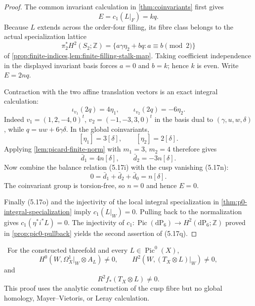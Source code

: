 \begin{proof}
The common invariant calculation in \cref{thm:coinvariants} first gives
\[
 E=c_1(L|_F)=kq.
\]
Because $L$ extends across the order-four filling, its fibre class belongs
to the actual specialization lattice
\[
 \pi_2^*H^2(S_2;\mathbb Z)
 =\{a\gamma\eta_2+bq:a\equiv b\pmod2\}
\]
of \cref{prop:finite-indices,lem:finite-filling-stalk-map}.  Taking
coefficient independence in the displayed invariant basis forces
$a=0$ and $b=k$; hence $k$ is even.  Write $E=2nq$.

Contraction with the two affine translation vectors is an exact integral
calculation:
\[
 \iota_{v_1}(2q)=4\eta_1,
 \qquad
 \iota_{v_2}(2q)=-6\eta_2.
\tag{5.17r}
\]
Indeed $v_1=(1,2,-4,0)^t$, $v_2=(-1,-3,3,0)^t$ in the basis dual to
$(\gamma,u,w,\delta)$, while
$q=uw+6\gamma\delta$.  In the global coinvariants,
\[
 [\eta_1]=3[\delta],\qquad [\eta_2]=2[\delta].
\]
Applying \cref{lem:picard-finite-norm} with $m_1=3$, $m_2=4$ therefore
gives
\[
 \bar d_1=4n[\delta],\qquad
 \bar d_2=-3n[\delta].
\tag{5.17s}
\]
Now combine the balance relation (5.17i) with the cusp vanishing (5.17n):
\[
 0=\bar d_1+\bar d_2+\bar d_0=n[\delta].
\]
The coinvariant group is torsion-free, so $n=0$ and hence $E=0$.

Finally (5.17o) and the injectivity of the local integral specialization in
\cref{thm:p0-integral-specialization} imply
$c_1(L|_W)=0$.  Pulling back to the normalization gives
$c_1(\eta^*i^*L)=0$.  The injectivity of
$c_1:\operatorname{Pic}(\mathrm{dP}_6)\to
H^2(\mathrm{dP}_6;\mathbb Z)$ proved in
\cref{prop:pic0-pullback} yields the second assertion of (5.17q).
\end{proof}



\begin{corollary}
\label{cor:candidate-pic0-route}
\Verified\ For the constructed threefold and every
$L\in\operatorname{Pic}^0(X)$,
\[
 H^0(W,\Omega_X^1|_W\otimes A_L)\ne0,
 \qquad
 H^2(W,(T_X\otimes L)|_W)\ne0,
\]
and
\[
 R^2f_*(T_X\otimes L)\ne0.
\tag{5.17f}
\]
This proof uses the analytic construction of the cusp fibre but no global
homology, Mayer--Vietoris, or Leray calculation.
\end{corollary}

